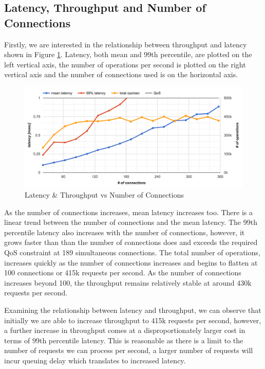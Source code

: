\subsection{Latency, Throughput and Number of Connections}

Firstly, we are interested in the relationship between throughput and latency shown in Figure \ref{fig:memcached-default-latency-vs-ops}. Latency, both mean and 99th percentile, are plotted on the left vertical axis, the number of operations per second is plotted on the right vertical axis and the number of connections used is on the horizontal axis.

\begin{figure}[h]
    \includegraphics[width=\textwidth]{./res2/m_baseline_latency.png}
    \caption{Latency \& Throughput vs Number of Connections}
    \label{fig:memcached-default-latency-vs-ops}
\end{figure}

As the number of connections increases, mean latency increases too. There is a linear trend between the number of connections and the mean latency. The 99th percentile latency also increases with the number of connections, however, it grows faster than than the number of connections does and exceeds the required QoS constraint at 189 simultaneous connections. The total number of operations, increases quickly as the number of connections increases and begins to flatten at 100 connections or 415k requests per second. As the number of connections increases beyond 100, the throughput remains relatively stable at around 430k requests per second.

Examining the relationship between latency and throughput, we can observe that initially we are able to increase throughput to 415k requests per second, however, a further increase in throughput comes at a disproportionately larger cost in terms of 99th percentile latency. This is reasonable as there is a limit to the number of requests we can process per second, a larger number of requests will incur queuing delay which translates to increased latency.

